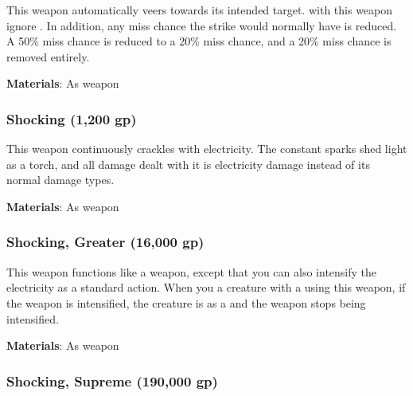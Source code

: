 This weapon automatically veers towards its intended target.
 with this weapon ignore .
In addition, any miss chance the strike would normally have is reduced.
A 50\% miss chance is reduced to a 20\% miss chance, and a 20\% miss chance is removed entirely.



\vspace{0.25em}
\textbf{Materials}: As weapon


\lowercase{\hypertarget{item:Shocking}{}}\label{item:Shocking}
\hypertarget{item:Shocking}{\subsubsection{Shocking\hfill{} (1,200 gp)}}

This weapon continuously crackles with electricity.
The constant sparks shed light as a torch, and all damage dealt with it is electricity damage instead of its normal damage types.



\vspace{0.25em}
\textbf{Materials}: As weapon


\lowercase{\hypertarget{item:Shocking, Greater}{}}\label{item:Shocking, Greater}
\hypertarget{item:Shocking, Greater}{\subsubsection{Shocking, Greater\hfill{} (16,000 gp)}}

This weapon functions like a  weapon, except that you can also intensify the electricity as a standard action.
When you  a creature with a  using this weapon, if the weapon is intensified,
the creature is \dazed as a  and the weapon stops being intensified.



\vspace{0.25em}
\textbf{Materials}: As weapon


\lowercase{\hypertarget{item:Shocking, Supreme}{}}\label{item:Shocking, Supreme}
\hypertarget{item:Shocking, Supreme}{\subsubsection{Shocking, Supreme\hfill{} (190,000 gp)}}

